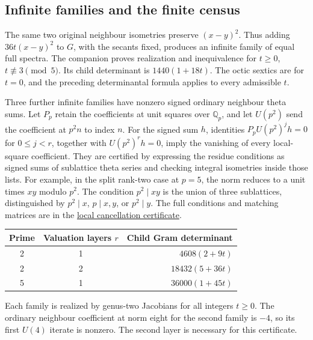 \documentclass[11pt,letterpaper]{amsart}
\theoremstyle{definition}
\numberwithin{equation}{section}
\newcommand{\Q}{\mathbb Q}
\begin{document}
\subsection{Infinite families and the finite census}

The same two original neighbour isometries preserve \((x-y)^2\).
Thus adding \(36t(x-y)^2\) to \(G\), with the secants fixed,
produces an infinite family of equal full spectra. The companion
proves realization and inequivalence for \(t\ge0\),
\(t\not\equiv3\pmod5\). Its child determinant is
\(1440(1+18t)\). The octic sextics are for \(t=0\), and the preceding determinantal
formula applies to every admissible \(t\).

Three further infinite families have nonzero signed ordinary
neighbour theta sums. Let \(P_p\) retain the coefficients at unit
squares over \(\Q_p\), and let \(U(p^2)\) send the coefficient at
\(p^2n\) to index \(n\). For the signed sum \(h\), identities
\(P_p U(p^2)^j h=0\) for \(0\le j<r\), together with
\(U(p^2)^r h=0\), imply the vanishing of every local-square
coefficient. They are certified by expressing the residue conditions
as signed sums of sublattice theta series and checking integral
isometries inside those lists. For example, in the split rank-two
case at \(p=5\), the norm reduces to a unit times \(xy\) modulo
\(p^2\). The condition \(p^2\mid xy\) is the union of three
sublattices, distinguished by \(p^2\mid x\), \(p\mid x,y\), or
\(p^2\mid y\). The full conditions and matching matrices are in
the \href{https://github.com/towre676-cloud/crest-root-calculus/blob/main/research/elliptic-quotients/opposite-secant-spectra/delay/local-geometry.md}{local cancellation certificate}.

\begin{center}
\begin{tabular}{ccr}
\toprule
Prime & Valuation layers \(r\) & Child Gram determinant \\
\midrule
2 & 1 & \(4608(2+9t)\) \\
2 & 2 & \(18432(5+36t)\) \\
5 & 1 & \(36000(1+45t)\) \\
\bottomrule
\end{tabular}
\end{center}
Each family is realized by genus-two Jacobians for all integers
\(t\ge0\). The ordinary neighbour coefficient at norm eight for
the second family is \(-4\), so its first \(U(4)\) iterate is
nonzero. The second layer is necessary for this certificate.
\end{document}
